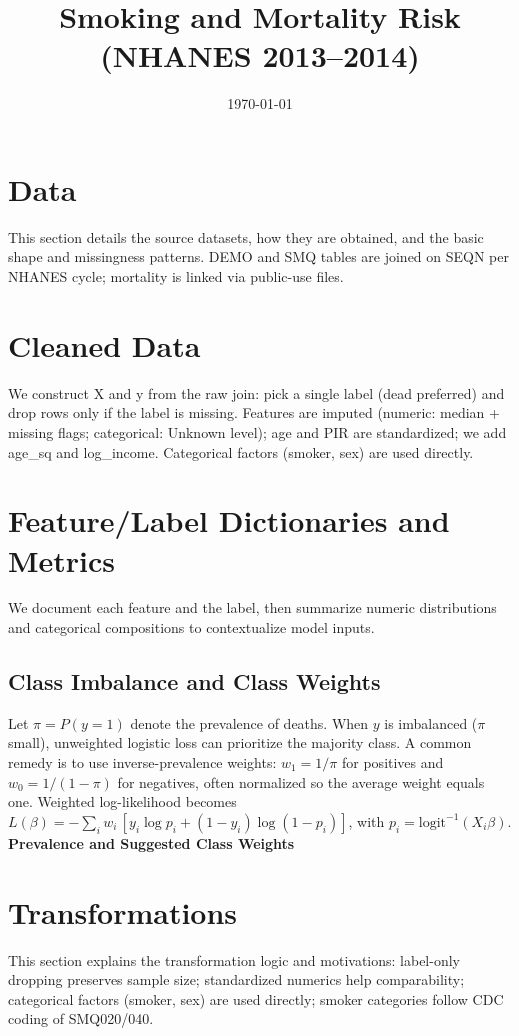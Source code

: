 \documentclass{article}
\title{Smoking and Mortality Risk (NHANES 2013--2014)}
\date{\today}
\begin{document}
\maketitle
\section{Data}
This section details the source datasets, how they are obtained, and the basic shape and missingness patterns. DEMO and SMQ tables are joined on SEQN per NHANES cycle; mortality is linked via public-use files.

\medskip
\section{Cleaned Data}
We construct X and y from the raw join: pick a single label (dead preferred) and drop rows only if the label is missing. Features are imputed (numeric: median + missing flags; categorical: Unknown level); age and PIR are standardized; we add age\_sq and log\_income. Categorical factors (smoker, sex) are used directly.
\medskip
\medskip
\section{Feature/Label Dictionaries and Metrics}
We document each feature and the label, then summarize numeric distributions and categorical compositions to contextualize model inputs.
\subsection*{Class Imbalance and Class Weights}
Let $\pi = P(y=1)$ denote the prevalence of deaths. When $y$ is imbalanced ($\pi$ small), unweighted logistic loss can prioritize the majority class.
 A common remedy is to use inverse-prevalence weights: $w_1 = 1/\pi$ for positives and $w_0 = 1/(1-\pi)$ for negatives, often normalized so the average weight equals one.
 Weighted log-likelihood becomes $L(\beta) = -\sum_i w_i\,[y_i \log p_i + (1-y_i) \log(1-p_i)]$, with $p_i = \text{logit}^{-1}(X_i\beta)$.
\noindent \textbf{Prevalence and Suggested Class Weights}
\par

\medskip
\section{Transformations}
This section explains the transformation logic and motivations: label-only dropping preserves sample size; standardized numerics help comparability; categorical factors (smoker, sex) are used directly; smoker categories follow CDC coding of SMQ020/040.
\end{document}
